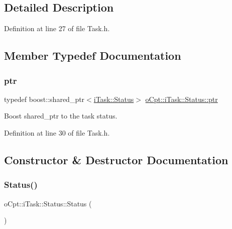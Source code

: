 \subsection{Detailed Description}


Definition at line 27 of file Task.\+h.



\subsection{Member Typedef Documentation}
\hypertarget{classo_cpt_1_1i_task_1_1_status_aaf766c58d038e2defc3de2dddb92d1eb}{}\label{classo_cpt_1_1i_task_1_1_status_aaf766c58d038e2defc3de2dddb92d1eb} 
\subsubsection{\texorpdfstring{ptr}{ptr}}
{\footnotesize\ttfamily typedef boost\+::shared\+\_\+ptr$<$\hyperlink{classo_cpt_1_1i_task_1_1_status}{i\+Task\+::\+Status}$>$ \hyperlink{classo_cpt_1_1i_task_1_1_status_aaf766c58d038e2defc3de2dddb92d1eb}{o\+Cpt\+::i\+Task\+::\+Status\+::ptr}}



Boost shared\+\_\+ptr to the task status. 



Definition at line 30 of file Task.\+h.



\subsection{Constructor \& Destructor Documentation}
\hypertarget{classo_cpt_1_1i_task_1_1_status_a5fab36410db264d0b9815f34227f33d0}{}\label{classo_cpt_1_1i_task_1_1_status_a5fab36410db264d0b9815f34227f33d0} 
\subsubsection{\texorpdfstring{Status()}{Status()}}
{\footnotesize\ttfamily o\+Cpt\+::i\+Task\+::\+Status\+::\+Status (\begin{DoxyParamCaption}{ }\end{DoxyParamCaption})}

